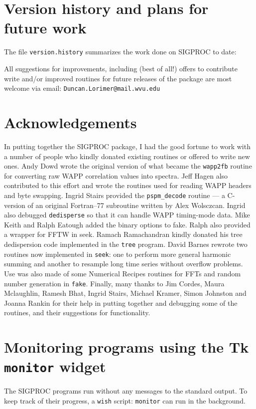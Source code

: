 \documentclass[11pt]{article}
\begin{document}
\section{Version history and plans for future work}
\label{past/future}
The file {\tt version.history} summarizes the work done
on SIGPROC to date:


\noindent
All suggestions for improvements, including (best of all!)
offers to contribute write and/or improved routines for future 
releases of the package are most welcome via email:
{\tt Duncan.Lorimer@mail.wvu.edu}

\section*{Acknowledgements}

In putting together the SIGPROC package, I had the good fortune to
work with a number of people who kindly donated existing routines or
offered to write new ones.  Andy Dowd wrote the original version of
what became the {\tt wapp2fb} routine for converting raw WAPP
correlation values into spectra. Jeff Hagen also contributed to this
effort and wrote the routines used for reading WAPP headers and byte
swapping. Ingrid Stairs provided the \verb+pspm_decode+ routine --- a
C-version of an original Fortran--77 subroutine written by Alex
Wolsczcan. Ingrid also debugged {\tt dedisperse} so that it can handle
WAPP timing-mode data.  Mike Keith and Ralph Eatough added the binary
options to fake. Ralph also provided a wrapper for FFTW in seek.
Ramach Ramachandran kindly donated his tree dedispersion code 
implemented in the {\tt tree} program. David Barnes rewrote
two routines now implemented in {\tt seek}: one to perform more 
general harmonic summing and another to resample long time series
without overflow problems. Use was also made of some Numerical Recipes
routines for FFTs and random number generation in {\tt fake}. Finally,
many thanks to Jim Cordes, Maura Mclaughlin, Ramesh Bhat, Ingrid
Stairs, Michael Kramer, Simon Johnston and Joanna Rankin
for their help in putting together and debugging some of the
routines, and their suggestions for functionality.

\clearpage
\appendix
\section{Monitoring programs using the Tk {\tt monitor} widget}
\label{monitoring}
The SIGPROC programs run without any messages to the standard
output. To keep track of their progress, a {\tt wish} script:
{\tt monitor} can run in the background. 
\end{document}
